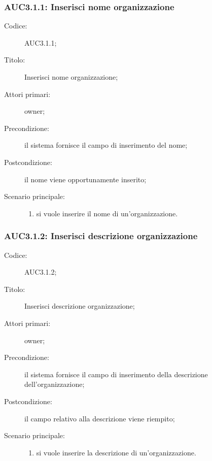 \documentclass[../../../analisi-dei-requisiti.tex]{subfiles}
\begin{document}
\subsubsection{AUC3.1.1: Inserisci nome organizzazione}%
\label{subs:AUC3.1.1}
\begin{description}
  \item[Codice:] AUC3.1.1;
  \item[Titolo:] Inserisci nome organizzazione;
  \item[Attori primari:]  owner;
  \item[Precondizione:] il sistema fornisce il campo di inserimento del nome;
  \item[Postcondizione:] il nome viene opportunamente inserito;
  \item[Scenario principale:]
        \begin{enumerate}
          \item si vuole inserire il nome di un'organizzazione.
        \end{enumerate}

\end{description}

\subsubsection{AUC3.1.2: Inserisci descrizione organizzazione}%
\label{subs:AUC3.1.2}
\begin{description}
  \item[Codice:] AUC3.1.2;
  \item[Titolo:] Inserisci descrizione organizzazione;
  \item[Attori primari:] owner;
  \item[Precondizione:] il sistema fornisce il campo di inserimento della descrizione dell'organizzazione;
  \item[Postcondizione:] il campo relativo alla descrizione viene riempito;
  \item[Scenario principale:]
        \begin{enumerate}
          \item si vuole inserire la descrizione di un'organizzazione.
        \end{enumerate}
\end{description}
\end{document}
